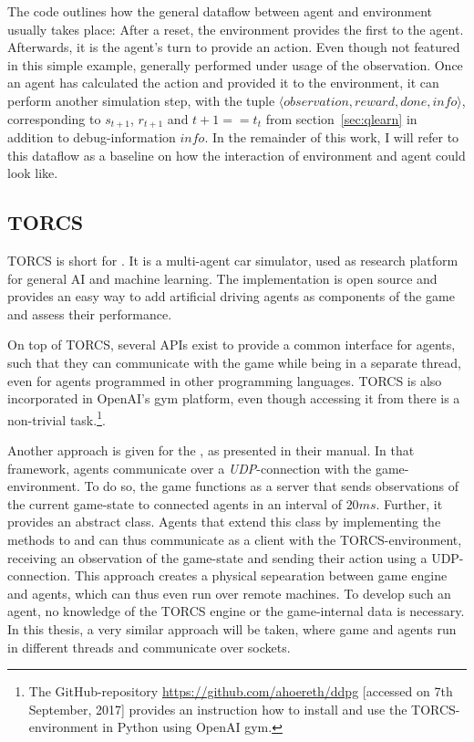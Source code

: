 The code outlines how the general dataflow between agent and environment usually takes place: After a reset, the environment provides the first  to the agent. Afterwards, it is the agent's turn to provide an action. Even though not featured in this simple example, generally performed under usage of the observation. Once an agent has calculated the action and provided it to the environment, it can perform another simulation step, with the tuple $\langle observation, reward, done, info\rangle$, corresponding to $s_{t+1}$, $r_{t+1}$ and $t+1==t_t$ from section~\ref{sec:qlearn} in addition to debug-information $info$. In the remainder of this work, I will refer to this dataflow as a baseline on how the interaction of environment and agent could look like.

\subsection{TORCS}

TORCS is short for \cite{wymann_torcs_2013, wymann_torcs_2015}. It is a multi-agent car simulator, used as research platform for general AI and machine learning. The implementation is open source and provides an easy way to add artificial driving agents as components of the game and assess their performance. 

On top of TORCS, several APIs exist to provide a common interface for agents, such that they can communicate with the game while being in a separate thread, even for agents programmed in other programming languages. TORCS is also incorporated in OpenAI's gym platform, even though accessing it from there is a non-trivial task.\footnote{The GitHub-repository \url{https://github.com/ahoereth/ddpg} [accessed on 7th September, 2017] provides an instruction how to install and use the TORCS-environment in Python using OpenAI gym.}. 

Another approach is given for the , as presented in their manual\cite{loiacono_simulated_2013}. In that framework, agents communicate over a \textit{UDP}-connection with the game-environment. To do so, the game functions as a server that sends observations of the current game-state to connected agents in an interval of $20ms$. Further, it provides an abstract  class. Agents that extend this class by implementing the methods to  and  can thus communicate as a client with the TORCS-environment, receiving an observation of the game-state and sending their action using a UDP-connection. This approach creates a physical sepearation between game engine and agents, which can thus even run over remote machines. To develop such an agent, no knowledge of the TORCS engine or the game-internal data is necessary. In this thesis, a very similar approach will be taken, where game and agents run in different threads and communicate over sockets. 

